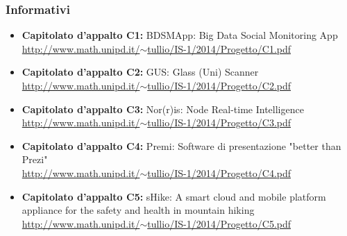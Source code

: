 \subsubsection{Informativi}
\begin{itemize}
	\item \textbf{Capitolato d’appalto C1:} BDSMApp: Big Data Social Monitoring App \href{http://www.math.unipd.it/~tullio/IS-1/2014/Progetto/C1.pdf}{http://www.math.unipd.it/$\sim$tullio/IS-1/2014/Progetto/C1.pdf}
	\item \textbf{ Capitolato d’appalto C2:} GUS: Glass (Uni) Scanner\\ \href{http://www.math.unipd.it/~tullio/IS-1/2014/Progetto/C2.pdf}{http://www.math.unipd.it/$\sim$tullio/IS-1/2014/Progetto/C2.pdf}
	\item \textbf{ Capitolato d’appalto C3:}  Nor(r)is: Node Real-time Intelligence \\ \href{http://www.math.unipd.it/~tullio/IS-1/2014/Progetto/C3.pdf}{http://www.math.unipd.it/$\sim$tullio/IS-1/2014/Progetto/C3.pdf}
	\item \textbf{ Capitolato d’appalto C4:} Premi: Software di presentazione "better than Prezi"\\ \href{http://www.math.unipd.it/~tullio/IS-1/2014/Progetto/C4.pdf}{http://www.math.unipd.it/$\sim$tullio/IS-1/2014/Progetto/C4.pdf}
	\item \textbf{ Capitolato d’appalto C5:} 
	sHike: A smart cloud and mobile platform appliance for the safety and health in mountain hiking\\ \href{http://www.math.unipd.it/~tullio/IS-1/2014/Progetto/C5.pdf}{http://www.math.unipd.it/$\sim$tullio/IS-1/2014/Progetto/C5.pdf}
\end{itemize}